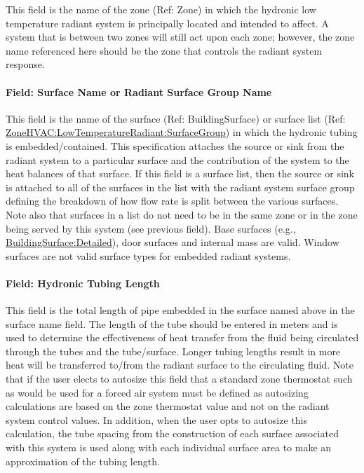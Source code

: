 This field is the name of the zone (Ref: Zone) in which the hydronic low temperature radiant system is principally located and intended to affect. A system that is between two zones will still act upon each zone; however, the zone name referenced here should be the zone that controls the radiant system response.

\paragraph{Field: Surface Name or Radiant Surface Group Name}\label{field-surface-name-or-radiant-surface-group-name}

This field is the name of the surface (Ref: BuildingSurface) or surface list (Ref: \hyperref[zonehvaclowtemperatureradiantsurfacegroup]{ZoneHVAC:LowTemperatureRadiant:SurfaceGroup}) in which the hydronic tubing is embedded/contained. This specification attaches the source or sink from the radiant system to a particular surface and the contribution of the system to the heat balances of that surface. If this field is a surface list, then the source or sink is attached to all of the surfaces in the list with the radiant system surface group defining the breakdown of how flow rate is split between the various surfaces. Note also that surfaces in a list do not need to be in the same zone or in the zone being served by this system (see previous field). Base surfaces (e.g., \hyperref[buildingsurfacedetailed]{BuildingSurface:Detailed}), door surfaces and internal mass are valid. Window surfaces are not valid surface types for embedded radiant systems.

\paragraph{Field: Hydronic Tubing Length}\label{field-hydronic-tubing-length-000}

This field is the total length of pipe embedded in the surface named above in the surface name field. The length of the tube should be entered in meters and is used to determine the effectiveness of heat transfer from the fluid being circulated through the tubes and the tube/surface. Longer tubing lengths result in more heat will be transferred to/from the radiant surface to the circulating fluid. Note that if the user elects to autosize this field that a standard zone thermostat such as would be used for a forced air system must be defined as autosizing calculations are based on the zone thermostat value and not on the radiant system control values. In addition, when the user opts to autosize this calculation, the tube spacing from the construction of each surface associated with this system is used along with each individual surface area to make an approximation of the tubing length.

